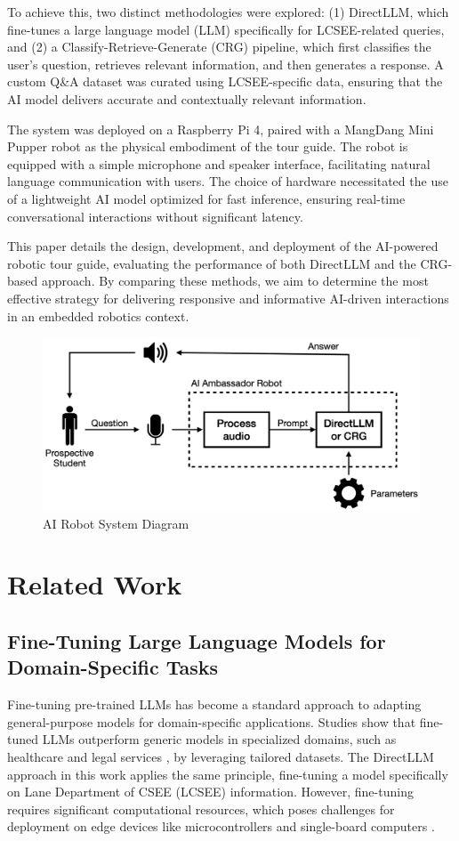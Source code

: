 \documentclass[conference]{IEEEtran}
\begin{document}
To achieve this, two distinct methodologies were explored: 
(1) DirectLLM, which fine-tunes a large language model (LLM) specifically for LCSEE-related queries, and 
(2) a Classify-Retrieve-Generate (CRG) pipeline, which first classifies the user's question, retrieves relevant information, and then generates a response. 
A custom Q\&A dataset was curated using LCSEE-specific data, ensuring that the AI model delivers accurate and contextually relevant information.

The system was deployed on a Raspberry Pi 4, paired with a MangDang Mini Pupper \cite{b1} robot as the physical embodiment of the tour guide. 
The robot is equipped with a simple microphone and speaker interface, facilitating natural language communication with users. 
The choice of hardware necessitated the use of a lightweight AI model optimized for fast inference, ensuring real-time conversational interactions without significant latency.

This paper details the design, development, and deployment of the AI-powered robotic tour guide, evaluating the performance of both DirectLLM and the CRG-based approach. 
By comparing these methods, we aim to determine the most effective strategy for delivering responsive and informative AI-driven interactions in an embedded robotics context.

\begin{figure}[t]
    \centering
    \includegraphics[width=0.70\linewidth]{assets/system_diagram.png}
    \caption{AI Robot System Diagram}
    \label{fig:system}
\end{figure}

\section{Related Work}
\subsection{Fine-Tuning Large Language Models for Domain-Specific Tasks}
Fine-tuning pre-trained LLMs has become a standard approach to adapting general-purpose models for domain-specific applications. 
Studies show that fine-tuned LLMs outperform generic models in specialized domains, such as healthcare and legal services \cite{b2}, by leveraging tailored datasets. 
The DirectLLM approach in this work applies the same principle, fine-tuning a model specifically on Lane Department of CSEE (LCSEE) information. 
However, fine-tuning requires significant computational resources, which poses challenges for deployment on edge devices like microcontrollers and single-board computers \cite{b3}.
\end{document}
